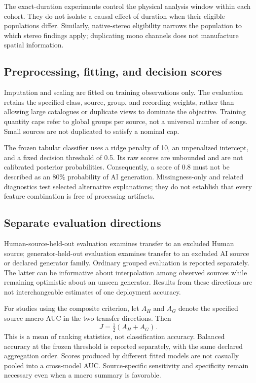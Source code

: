 The exact-duration experiments control the physical analysis window within each
cohort. They do not isolate a causal effect of duration when their eligible
populations differ. Similarly, native-stereo eligibility narrows the population
to which stereo findings apply; duplicating mono channels does not manufacture
spatial information.

\subsection{Preprocessing, fitting, and decision scores}

Imputation and scaling are fitted on training observations only. The evaluation
retains the specified class, source, group, and recording weights, rather than
allowing large catalogues or duplicate views to dominate the objective. Training
quantity caps refer to global groups per source, not a universal number of
songs. Small sources are not duplicated to satisfy a nominal cap.

The frozen tabular classifier uses a ridge penalty of 10, an unpenalized
intercept, and a fixed decision threshold of 0.5. Its raw scores are unbounded
and are not calibrated posterior probabilities. Consequently, a score of 0.8
must not be described as an 80\% probability of AI generation. Missingness-only
and related diagnostics test selected alternative explanations; they do not
establish that every feature combination is free of processing artifacts.

\subsection{Separate evaluation directions}

Human-source-held-out evaluation examines transfer to an excluded Human source;
generator-held-out evaluation examines transfer to an excluded AI source or
declared generator family. Ordinary grouped evaluation is reported separately.
The latter can be informative about interpolation among observed sources while
remaining optimistic about an unseen generator. Results from these directions
are not interchangeable estimates of one deployment accuracy.

For studies using the composite criterion, let $A_H$ and $A_G$ denote the
specified source-macro AUC in the two transfer directions. Then
\[
  J = \tfrac{1}{2}(A_H + A_G).
\]
This is a mean of ranking statistics, not classification accuracy. Balanced
accuracy at the frozen threshold is reported separately, with the same declared
aggregation order. Scores produced by different fitted models are not casually
pooled into a cross-model AUC. Source-specific sensitivity and specificity remain
necessary even when a macro summary is favorable.


